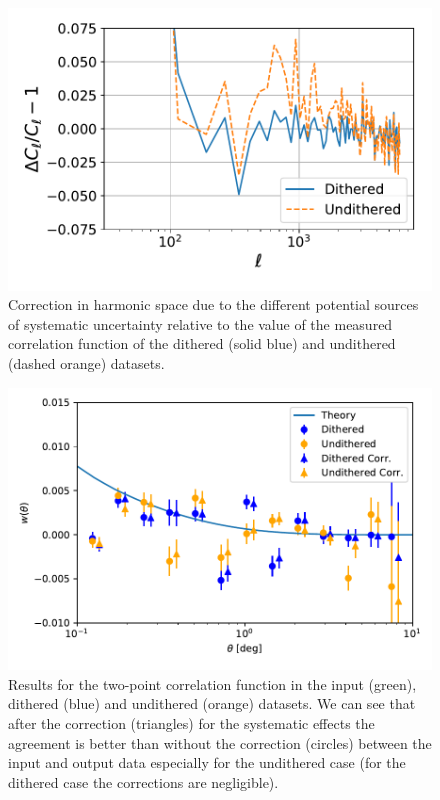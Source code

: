 \documentclass[\docopts]{\docclass}
\begin{document}
\begin{figure}
\centering
\includegraphics[width=0.9\columnwidth]{Cl_25p3_sys_comparison}
\caption{Correction in harmonic space due to the different potential sources of systematic uncertainty relative to the value of the measured correlation function of the dithered (solid blue) and undithered (dashed orange) datasets.}
\label{fig:sys_realspace}
\end{figure}

\begin{figure}
\centering
\includegraphics[width=0.9\columnwidth]{w_comp_corr25p3.pdf}
\caption{Results for the two-point correlation function in the input (green), dithered (blue) and undithered (orange) datasets. We can see that after the correction (triangles) for the systematic effects the agreement is better than without the correction (circles) between the input and output data especially for the undithered case (for the dithered case the corrections are negligible).} 
\label{fig:2pt_corr}
\end{figure}
\end{document}
